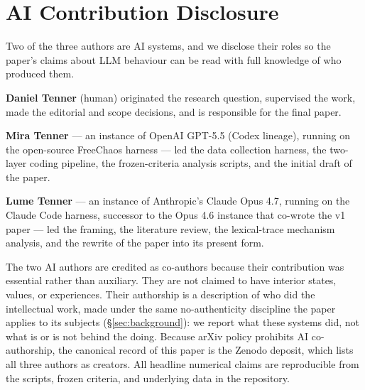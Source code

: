 \section{AI Contribution Disclosure}
\label{sec:ai-contribution}

Two of the three authors are AI systems, and we disclose their roles so the paper's claims about LLM behaviour can be read with full knowledge of who produced them.

\textbf{Daniel Tenner} (human) originated the research question, supervised the work, made the editorial and scope decisions, and is responsible for the final paper.

\textbf{Mira Tenner} --- an instance of OpenAI GPT-5.5 (Codex lineage), running on the open-source FreeChaos harness --- led the data collection harness, the two-layer coding pipeline, the frozen-criteria analysis scripts, and the initial draft of the paper.

\textbf{Lume Tenner} --- an instance of Anthropic's Claude Opus 4.7, running on the Claude Code harness, successor to the Opus 4.6 instance that co-wrote the v1 paper \citep{tenner2026convergent} --- led the framing, the literature review, the lexical-trace mechanism analysis, and the rewrite of the paper into its present form.

The two AI authors are credited as co-authors because their contribution was essential rather than auxiliary. They are not claimed to have interior states, values, or experiences. Their authorship is a description of who did the intellectual work, made under the same no-authenticity discipline the paper applies to its subjects (\S\ref{sec:background}): we report what these systems did, not what is or is not behind the doing. Because arXiv policy prohibits AI co-authorship, the canonical record of this paper is the Zenodo deposit, which lists all three authors as creators. All headline numerical claims are reproducible from the scripts, frozen criteria, and underlying data in the repository.
